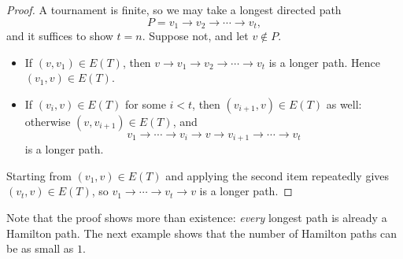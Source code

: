 \begin{proof}
    A tournament is finite, so we may take a longest directed path
    \[
        P = v_1 \to v_2 \to \cdots \to v_t,
    \]
    and it suffices to show \(t = n\). Suppose not, and let \(v \notin P\).
    \begin{center}
    \end{center}
    \begin{itemize}
        \item If \((v, v_1) \in E(T)\), then \(v \to v_1 \to v_2 \to \cdots \to v_t\) is a longer path. Hence \((v_1, v) \in E(T)\).
        \item If \((v_i, v) \in E(T)\) for some \(i < t\), then \((v_{i+1}, v) \in E(T)\) as well: otherwise \((v, v_{i+1}) \in E(T)\), and
        \[
            v_1 \to \cdots \to v_i \to v \to v_{i+1} \to \cdots \to v_t
        \]
        is a longer path.
    \end{itemize}
    Starting from \((v_1, v) \in E(T)\) and applying the second item repeatedly gives \((v_t, v) \in E(T)\), so \(v_1 \to \cdots \to v_t \to v\) is a longer path. \conta
\end{proof}

Note that the proof shows more than existence: \emph{every} longest path is already a Hamilton path. The next example shows that the number of Hamilton paths can be as small as \(1\).

